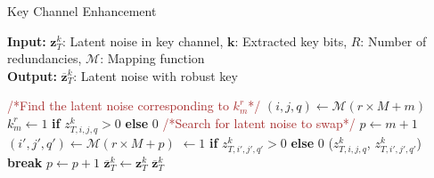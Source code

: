 \begin{algorithm}[t]
\footnotesize
\caption{Key Channel Enhancement}
\label{alg:generate_key}
\textbf{Input:} $\mathbf{z}_T^k$: Latent noise in key channel, $\mathbf{k}$: Extracted key bits, $R$: Number of redundancies, $\mathcal{M}$: Mapping function \\
{\textbf{Output:} $\overline{\mathbf{z}}_T^{k}$: Latent noise with robust key}
\begin{algorithmic}[1]
        \STATE \textcolor{brown}{/*Find the latent noise corresponding to $k^r_m$*/}
        \STATE $(i, j, q) \gets \mathcal{M}(r \times M + m)$ 
        \STATE $k^r_m \gets 1$ \textbf{if} ${z}^k_{T, i, j, q} > 0$ \textbf{else} $0$
            \STATE \textcolor{brown}{/*Search for latent noise to swap*/}
            \STATE $p \gets m + 1$
                \STATE $(i', j', q') \gets \mathcal{M}(r \times M + p)$
                \STATE {} $\gets 1$ \textbf{if} ${z}^k_{T, i', j', q'} > 0$ \textbf{else} $0$
                    \STATE {}(${z}^k_{T, i, j, q}$, ${z}^k_{T, i', j', q'}$)
                    \STATE \textbf{break}
                \ENDIF
                \STATE $p \gets p + 1$
            \ENDWHILE
        \ENDIF
    \ENDFOR
\ENDFOR
\STATE $\overline{\mathbf{z}}_T^{k} \gets \mathbf{z}_T^{k}$
 $\overline{\mathbf{z}}_T^{k}$
\end{algorithmic}
\end{algorithm}

